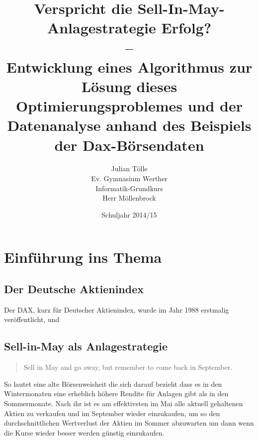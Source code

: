 \documentclass[12pt, a4paper, titlepage]{report}
\begin{document}
    \begin{titlepage}
        \title{Verspricht die Sell-In-May-Anlagestrategie Erfolg?\\
                –\\
                Entwicklung eines Algorithmus zur Lösung dieses Optimierungsproblemes
                und der Datenanalyse anhand des Beispiels der Dax-Börsendaten}
        \author{Julian Tölle\\
                Ev. Gymnasium Werther\\
                Informatik-Grundkurs\\
                Herr Möllenbrock}
        \date{Schuljahr 2014/15}

        \maketitle
    \end{titlepage}

    \tableofcontents
    \thispagestyle{empty}

    \setcounter{page}{2}

    \chapter{Einführung ins Thema}
        
        \section{Der Deutsche Aktienindex}
            Der DAX, kurz für Deutscher Aktienindex, wurde im Jahr 1988 erstmalig veröffentlicht,
            und

        \section{Sell-in-May als Anlagestrategie}
            \begin{quote}
                Sell in May and go away, but remember to come back in September.
            \end{quote}
            So lautet eine alte Börsenweisheit die sich darauf bezieht dass es
            in den Wintermonaten eine erheblich höhere Rendite für Anlagen gibt
            als in den Sommermonate. Nach ihr ist es am effektivsten im Mai alle
            aktuell gehaltenen Aktien zu verkaufen und im September wieder
            einzukaufen, um so den durchschnittlichen Wertverlust der Aktien im
            Sommer abzuwarten um dann wenn die Kurse wieder besser werden
            günstig einzukaufen.
\end{document}

